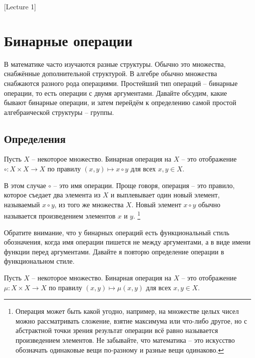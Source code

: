 [Lecture 1]


\newpage

\section{Бинарные операции}

В математике часто изучаются разные структуры.
Обычно это множества, снабжённые дополнительной структурой.
В алгебре обычно множества снабжаются разного рода операциями.
Простейший тип операций -- бинарные операции, то есть операции с двумя аргументами.
Давайте обсудим, какие бывают бинарные операции, и затем перейдём к определению самой простой алгебраической структуры -- группы.

\subsection{Определения}

\begin{definition}
Пусть $X$ -- некоторое множество.
Бинарная операция на $X$ -- это отображение $\circ\colon X\times X\to X$ по правилу $(x, y)\mapsto x\circ y$ для всех $x, y\in X$.
\end{definition}

В этом случае $\circ$ -- это имя операции.
Проще говоря, операция -- это правило, которое съедает два элемента из $X$ и выплевывает один новый элемент, называемый $x\circ y$, из того же множества $X$.
Новый элемент $x\circ y$ обычно называется произведением элементов $x$ и $y$.%
\footnote{Операция может быть какой угодно, например, на множестве целых чисел можно рассматривать сложение, взятие максимума или что-либо другое, но с абстрактной точки зрения результат операции всё равно называется произведением элементов.
Не забывайте, что математика -- это искусство обозначать одинаковые вещи по-разному и разные вещи одинаково.}

Обратите внимание, что у бинарных операций есть функциональный стиль обозначения, когда имя операции пишется не между аргументами, а в виде имени функции перед аргументами.
Давайте я повторю определение операции в функциональном стиле.

\begin{definition}
Пусть $X$ -- некоторое множество.
Бинарная операция на $X$ -- это отображение $\mu\colon X\times X\to X$ по правилу $(x, y)\mapsto \mu(x, y)$ для всех $x, y\in X$.
\end{definition}

